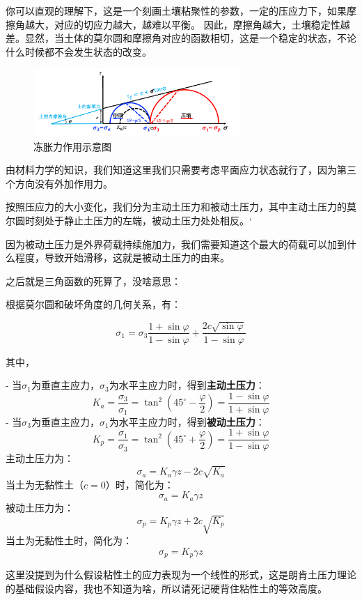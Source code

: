 \documentclass[12pt, a4paper, oneside, UTF8]{ctexbook}
\begin{document}
\begin{example}
你可以直观的理解下，这是一个刻画土壤粘聚性的参数，一定的压应力下，如果摩擦角越大，对应的切应力越大，越难以平衡。
因此，摩擦角越大，土壤稳定性越差。显然，当土体的莫尔圆和摩擦角对应的函数相切，这是一个稳定的状态，不论什么时候都不会发生状态的改变。

\begin{figure}[H]
    \centering
    \includegraphics[width=0.7\textwidth]{../figure/2.png}
    \caption{冻胀力作用示意图}
\end{figure}

由材料力学的知识，我们知道这里我们只需要考虑平面应力状态就行了，因为第三个方向没有外加作用力。

按照压应力的大小变化，我们分为主动土压力和被动土压力，其中主动土压力的莫尔圆时刻处于静止土压力的左端，被动土压力处处相反。‘

因为被动土压力是外界荷载持续施加力，我们需要知道这个最大的荷载可以加到什么程度，导致开始滑移，这就是被动土压力的由来。

之后就是三角函数的死算了，没啥意思：

根据莫尔圆和破坏角度的几何关系，有：

\[
\sigma_1 = \sigma_3 \frac{1 + \sin \varphi}{1 - \sin \varphi} + \frac{2 c \sqrt{\sin \varphi}}{1 - \sin \varphi}
\]

其中，

- 当\(\sigma_1\)为垂直主应力，\(\sigma_3\)为水平主应力时，得到\textbf{主动土压力}：
\[
K_a = \frac{\sigma_3}{\sigma_1} = \tan^2 \left(45^\circ - \frac{\varphi}{2}\right) = \frac{1 - \sin \varphi}{1 + \sin \varphi}
\]
- 当\(\sigma_3\)为垂直主应力，\(\sigma_1\)为水平主应力时，得到\textbf{被动土压力}：
\[
K_p = \frac{\sigma_1}{\sigma_3} = \tan^2 \left(45^\circ + \frac{\varphi}{2}\right) = \frac{1 + \sin \varphi}{1 - \sin \varphi}
\]
主动土压力为：
\[
\sigma_a = K_a \gamma z - 2 c \sqrt{K_a}
\]
当土为无黏性土（\(c=0\)）时，简化为：
\[
\sigma_a = K_a \gamma z
\]
被动土压力为：
\[
\sigma_p = K_p \gamma z + 2 c \sqrt{K_p}
\]
当土为无黏性土时，简化为：
\[
\sigma_p = K_p \gamma z
\]

\begin{remark}
    这里没提到为什么假设粘性土的应力表现为一个线性的形式，这是朗肯土压力理论的基础假设内容，我也不知道为啥，所以请死记硬背住粘性土的等效高度。
\end{remark}


\end{example}
\end{document}
